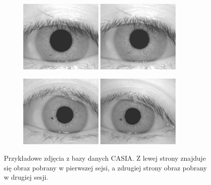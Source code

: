 \documentclass[10pt,polish,a4paper,oneside]{ppfcmthesis}
\begin{document}
\begin{figure}[h]
  \centering
  \begin{subfigure}[b]{\textwidth}
    \centering
    \includegraphics[width=0.45\textwidth]{images/experiment/CasiaExampleOneLeft.png}
    \includegraphics[width=0.45\textwidth]{images/experiment/CasiaExampleOneRight.png}
  \end{subfigure}
  \begin{subfigure}[b]{\textwidth}
    \centering
    \includegraphics[width=0.45\textwidth]{images/experiment/CasiaExampleTwoLeft.png}
    \includegraphics[width=0.45\textwidth]{images/experiment/CasiaExampleTwoRight.png}
  \end{subfigure}
  \caption{Przykładowe zdjęcia z bazy danych CASIA. Z lewej strony
  znajduje się obraz pobrany w pierwszej sejsi, a zdrugiej strony obraz pobrany w drugiej sesji.}
  \label{fig:casiaExample}
\end{figure}
\end{document}

